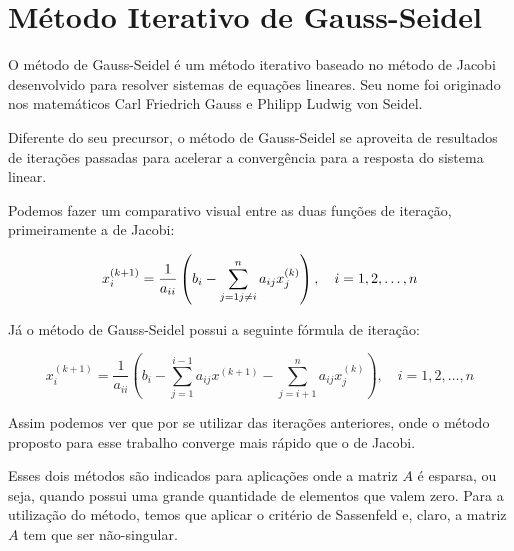 \chapter{Método Iterativo de Gauss-Seidel}
O método de Gauss-Seidel é um método iterativo baseado no método de Jacobi desenvolvido para resolver sistemas de equações lineares. Seu nome foi originado nos matemáticos Carl Friedrich Gauss e Philipp Ludwig von Seidel.

Diferente do seu precursor, o método de Gauss-Seidel se aproveita de resultados de iterações passadas para acelerar a convergência para a resposta do sistema linear.

Podemos fazer um comparativo visual entre as duas funções de iteração, primeiramente a de Jacobi:

\[x_i^{(k+1)} = \dfrac{1}{a_{ii}}\left(b_i - \sum_{j=1\\j\neq i}^{n}{a_{ij}x_{j}^{(k)}}\right), \quad i = 1, 2, \ldots, n\]

Já o método de Gauss-Seidel possui a seguinte fórmula de iteração:

\[x_i^{(k+1)} = \dfrac{1}{a_{ii}}\left(b_i - \sum_{j=1}^{i-1}{a_{ij}x^{(k+1)}} - \sum_{j=i+1}^{n}{a_{ij}x_{j}^{(k)}}\right), \quad i = 1, 2, \ldots, n\]

Assim podemos ver que por se utilizar das iterações anteriores, onde  o método proposto para esse trabalho converge mais rápido que o de Jacobi.

Esses dois métodos são indicados para aplicações onde a matriz \(A\) é esparsa, ou seja, quando possui uma grande quantidade de elementos que valem zero. Para a utilização do método, temos que aplicar o critério de Sassenfeld e, claro, a matriz \(A\) tem que ser não-singular.